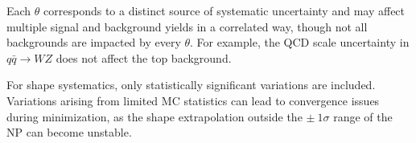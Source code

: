 Each $\theta$ corresponds to a distinct source of systematic uncertainty and may affect multiple signal and background yields in a correlated way, though not all backgrounds are impacted by every $\theta$. For example, the QCD scale uncertainty in $q\bar{q} \to WZ$ does not affect the top background.

For shape systematics, only statistically significant variations are included. Variations arising from limited MC statistics can lead to convergence issues during minimization, as the shape extrapolation outside the $\pm~1\sigma$ range of the NP can become unstable.
